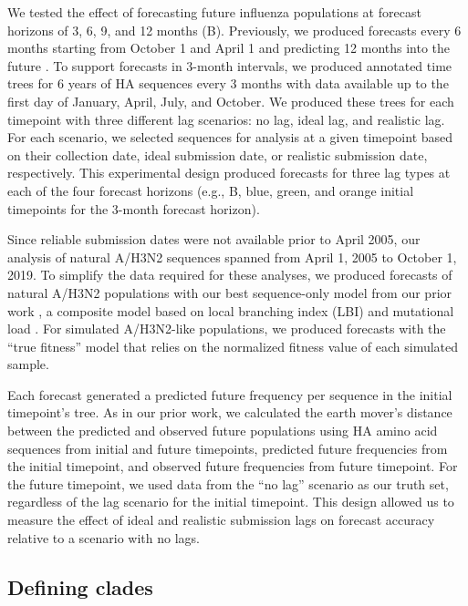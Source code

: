 \documentclass[9pt,lineno]{elife}
\begin{document}
We tested the effect of forecasting future influenza populations at forecast horizons of 3, 6, 9, and 12 months (B).
Previously, we produced forecasts every 6 months starting from October 1 and April 1 and predicting 12 months into the future \citep{Huddleston2020}.
To support forecasts in 3-month intervals, we produced annotated time trees for 6 years of HA sequences every 3 months with data available up to the first day of January, April, July, and October.
We produced these trees for each timepoint with three different lag scenarios: no lag, ideal lag, and realistic lag.
For each scenario, we selected sequences for analysis at a given timepoint based on their collection date, ideal submission date, or realistic submission date, respectively.
This experimental design produced forecasts for three lag types at each of the four forecast horizons (e.g., B, blue, green, and orange initial timepoints for the 3-month forecast horizon).

Since reliable submission dates were not available prior to April 2005, our analysis of natural A/H3N2 sequences spanned from April 1, 2005 to October 1, 2019.
To simplify the data required for these analyses, we produced forecasts of natural A/H3N2 populations with our best sequence-only model from our prior work \citep{Huddleston2020}, a composite model based on local branching index (LBI) \citep{Neher:2014eu} and mutational load \citep{Luksza:2014hj}.
For simulated A/H3N2-like populations, we produced forecasts with the ``true fitness'' model that relies on the normalized fitness value of each simulated sample.

Each forecast generated a predicted future frequency per sequence in the initial timepoint's tree.
As in our prior work, we calculated the earth mover's distance \citep{Rubner1998} between the predicted and observed future populations using HA amino acid sequences from initial and future timepoints, predicted future frequencies from the initial timepoint, and observed future frequencies from future timepoint.
For the future timepoint, we used data from the ``no lag'' scenario as our truth set, regardless of the lag scenario for the initial timepoint.
This design allowed us to measure the effect of ideal and realistic submission lags on forecast accuracy relative to a scenario with no lags.

\subsection{Defining clades}
\end{document}
